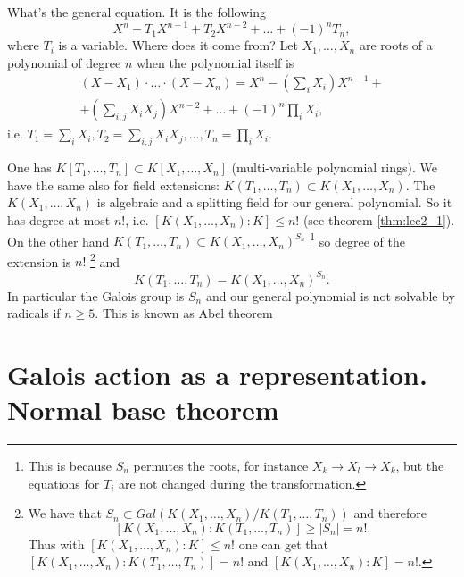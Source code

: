 \begin{example}
  What's the general equation. It is the following
  \[
  X^n - T_1 X^{n-1} + T_2 X^{n-2} + \dots + \left(-1\right)^n T_n,
  \]
  where $T_i$ is a variable. Where does it come from? Let
  $X_1, \dots, X_n$ are roots of a polynomial of degree $n$ when the
  polynomial itself is
  \begin{eqnarray}
  \left(X - X_1\right) \cdot \dots \cdot \left(X - X_n\right) =
  X^n - \left(\sum_i X_i \right) X^{n-1} +
  \nonumber \\
  +
  \left(\sum_{i,j} X_i X_j \right) X^{n-2} + \dots +
  \left(-1\right)^n \prod_i X_i,
  \nonumber
  \end{eqnarray}
  i.e.
  $T_1 = \sum_i X_i, T_2 = \sum_{i,j} X_i X_j, \dots, T_n = \prod_i
  X_i$.

  One has $K\left[T_1, \dots, T_n\right] \subset K\left[X_1, \dots,
    X_n\right]$ (multi-variable polynomial rings). We have the same
  also for field extensions:
  $K\left(T_1, \dots, T_n\right) \subset K\left(X_1, \dots,
  X_n\right)$.
  The $K\left(X_1, \dots, X_n\right)$ is algebraic and a
  splitting field for our general polynomial. So it has degree at most
  $n!$, i.e.
  $\left[K\left(X_1, \dots, X_n\right):K\right] \le n!$
  (see theorem \ref{thm:lec2_1}). On the other hand
  $K\left(T_1, \dots, T_n\right) \subset K\left(X_1, \dots,
  X_n\right)^{S_n}$
  \footnote{
    This is because $S_n$ permutes the roots, for instance $X_k \to X_l \to
    X_k$, but the equations for $T_i$ are not changed during the
    transformation. 
  }
  so degree of the extension is $n!$
  \footnote{
    We have that
    $S_n \subset Gal\left(K\left(X_1, \dots, X_n\right)/
    K\left(T_1, \dots, T_n\right)\right)$ and therefore
    \[
    \left[K\left(X_1, \dots, X_n\right):
      K\left(T_1, \dots, T_n\right)\right] \ge \left|S_n\right| = n!.
    \]
    Thus with $\left[K\left(X_1, \dots, X_n\right):K\right] \le n!$
    one can get that
    $\left[K\left(X_1, \dots, X_n\right):
      K\left(T_1, \dots, T_n\right)\right] = n!$
    and
    $\left[K\left(X_1, \dots, X_n\right):K\right] = n!$.
  }
  and
  \[
  K\left(T_1, \dots, T_n\right) = K\left(X_1, \dots,
  X_n\right)^{S_n}.
  \]
  In particular the Galois group is $S_n$ and our
  general polynomial is not solvable by radicals if $n \ge 5$.
  This is known as Abel theorem
  \label{ex:lec8_generalequation}
\end{example}

\section{Galois action as a representation. Normal base theorem}

